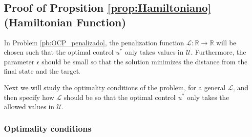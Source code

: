 
\subsection{Proof of Propsition \ref{prop:Hamiltoniano} (Hamiltonian Function)}\label{proof:Hamiltoniano}



In Problem \ref{pb:OCP_penalizado}, the penalization function $\mathcal L: \mathbb{R} \rightarrow \mathbb{R}$ will be chosen such that the optimal control $u^*$ only takes values in $\mathcal U$. Furthermore, the parameter $\epsilon$ should be small so that the solution minimizes the distance from the final state and the target.

Next we will study the optimality conditions of the problem, for a general $\mathcal L$, and then specify how $\mathcal L$ should be so that the optimal control $u^*$ only takes the allowed values in $\mathcal U$.

\subsubsection{Optimality conditions}

